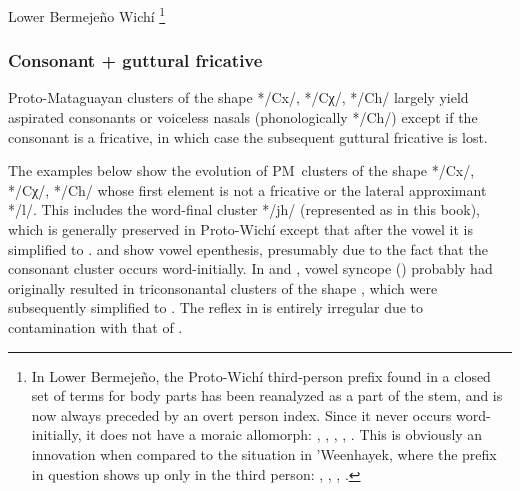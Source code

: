 \ea\label{ex:syllnt:lbw}
Lower Bermejeño Wichí \citep[239, 289, 320--321]{VN14}\footnote{In Lower Bermejeño, the Proto-Wichí third-person prefix found in a closed set of terms for body parts has been reanalyzed as a part of the stem, and is now always preceded by an overt person index. Since it never occurs word-initially, it does not have a moraic allomorph: , , , ,  \citep[147]{VN14}. This is obviously an innovation when compared to the situation in 'Weenhayek, where the prefix in question shows up only in the third person: , , , .}
    \begin{xlist}
        \ex {}
        \ex {}
        \ex {}
        \ex {}
        \ex {} 
    \end{xlist}
\z
{}

\subsubsection{Consonant + guttural fricative}\label{wi-consonant-dorsal}

Proto-Mataguayan clusters of the shape */Cx/, */Cχ/, */Ch/ largely yield aspirated consonants or voiceless nasals (phonologically */Ch/) except if the consonant is a fricative, in which case the subsequent guttural fricative is lost.

The examples below show the evolution of PM~clusters of the shape */Cx/, */Cχ/, */Ch/ whose first element is not a fricative or the lateral approximant */l/. This includes the word-final cluster */jh/ (represented as  in this book), which is generally preserved in Proto-Wichí except that after the vowel  it is simplified to  .  and  show vowel epenthesis, presumably due to the fact that the consonant cluster occurs word-initially. In  and , vowel syncope () probably had originally resulted in triconsonantal clusters of the shape , which were subsequently simplified to . The reflex in  is entirely irregular due to contamination with that of . 

